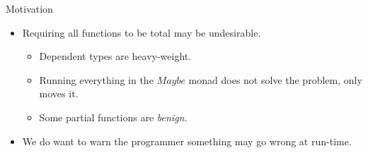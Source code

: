 \documentclass[serif,professionalfont]{beamer}
\newcommand{\Conid}[1]{\mathit{#1}}
\theoremstyle{plain}
\theoremstyle{definition}
\begin{document}
\begin{frame}{Motivation}

    \begin{itemize}
    
        \item Requiring all functions to be total may be undesirable.
        
            \begin{itemize}
            
                \item Dependent types are heavy-weight.
                
                \item Running everything in the \ensuremath{\Conid{Maybe}} monad does not solve the problem, only moves it.

                \item Some partial functions are \emph{benign}.
                
            \end{itemize}

        \item We do want to warn the programmer something may go wrong at run-time.

    \end{itemize}

\end{frame}
\end{document}
